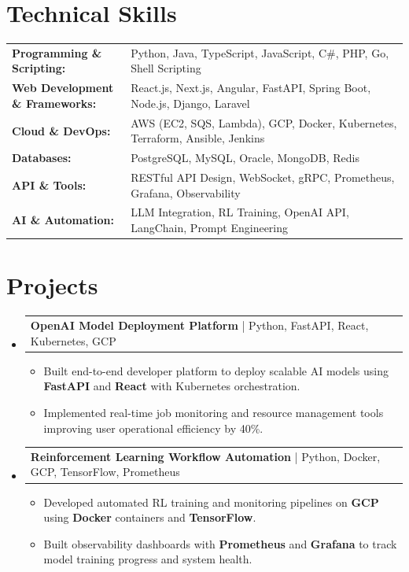 \documentclass[letterpaper,10pt]{article}
\makeatletter
\newcommand{\resumeItem}[1]{
  \item{\fontsize{8pt}{9pt}\selectfont
    #1 \vspace{-3pt}
  }
}
\newcommand{\resumeProjectHeading}[2]{
    \item
    \begin{tabular*}{1.001\textwidth}{l@{\extracolsep{\fill}}r}
      \fontsize{8.5pt}{10pt}#1 & \textbf{\fontsize{8.5pt}{10pt} #2}\\
    \end{tabular*}\vspace{-7pt}
}
\newcommand{\resumeSubHeadingListStart}{\begin{itemize}[leftmargin=0pt, label={}]}
\newcommand{\resumeSubHeadingListEnd}{\end{itemize}}
\newcommand{\resumeItemListStart}{\begin{itemize}[leftmargin=*]}
\newcommand{\resumeItemListEnd}{\end{itemize}\vspace{-5pt}}
\makeatother
\begin{document}
\section{Technical Skills}
        \vspace{-14pt}
        \begin{table}[h]
            \fontsize{8pt}{9pt}\selectfont
            \begin{tabular}{p{0.3\linewidth} p{0.7\linewidth}}
                \textbf{Programming \& Scripting:} & Python, Java, TypeScript, JavaScript, C\#, PHP, Go, Shell Scripting \\
                \textbf{Web Development \& Frameworks:} & React.js, Next.js, Angular, FastAPI, Spring Boot, Node.js, Django, Laravel \\
                \textbf{Cloud \& DevOps:} & AWS (EC2, SQS, Lambda), GCP, Docker, Kubernetes, Terraform, Ansible, Jenkins \\
                \textbf{Databases:} & PostgreSQL, MySQL, Oracle, MongoDB, Redis \\
                \textbf{API \& Tools:} & RESTful API Design, WebSocket, gRPC, Prometheus, Grafana, Observability \\
                \textbf{AI \& Automation:} & LLM Integration, RL Training, OpenAI API, LangChain, Prompt Engineering \\
            \end{tabular}
        \end{table}
 \vspace{-18pt}

\section{Projects}
    \vspace{-5pt}
    \resumeSubHeadingListStart
          \resumeProjectHeading
            {\textbf{OpenAI Model Deployment Platform} | Python, FastAPI, React, Kubernetes, GCP}{}
            \resumeItemListStart
                \resumeItem{Built end-to-end developer platform to deploy scalable AI models using \textbf{FastAPI} and \textbf{React} with Kubernetes orchestration.}
                \resumeItem{Implemented real-time job monitoring and resource management tools improving user operational efficiency by 40\%.}
            \resumeItemListEnd
        \vspace{-12pt}
    
        \resumeProjectHeading
            {\textbf{Reinforcement Learning Workflow Automation} | Python, Docker, GCP, TensorFlow, Prometheus}{}
        \resumeItemListStart
                \resumeItem{Developed automated RL training and monitoring pipelines on \textbf{GCP} using \textbf{Docker} containers and \textbf{TensorFlow}.}
                \resumeItem{Built observability dashboards with \textbf{Prometheus} and \textbf{Grafana} to track model training progress and system health.}
        \resumeItemListEnd
      \vspace{-12pt}
    \resumeSubHeadingListEnd
\end{document}
